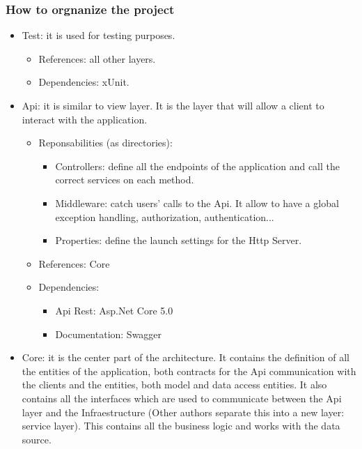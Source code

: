         \subsubsection{How to orgnanize the project}
        \begin{itemize}
            \item Test: it is used for testing purposes.
                \begin{itemize}
                    \item References: all other layers.
                    \item Dependencies: xUnit.
                \end{itemize}
            \item Api: it is similar to view layer. It is the layer that will allow a client to interact with the application.
                \begin{itemize}
                   \item Reponsabilities (as directories):
                        \begin{itemize}
                            \item Controllers: define all the endpoints of the application and call the correct services on each method.
                            \item Middleware: catch users' calls to the Api. It allow to have a global exception handling, authorization, authentication...
                            \item Properties: define the launch settings for the Http Server.
                        \end{itemize}
                    \item References: Core
                    \item Dependencies:
                        \begin{itemize}
                            \item Api Rest: Asp.Net Core 5.0
                            \item Documentation: Swagger
                        \end{itemize}
                \end{itemize}
            \item Core: it is the center part of the architecture. It contains the definition of all the entities of the application, both contracts for the Api communication with the clients and the entities, both model and data access entities. It also contains all the interfaces which are used to communicate between the Api layer and the Infraestructure (Other authors separate this into a new layer: service layer). This contains all the business logic and works with the data source.

\end{itemize}
